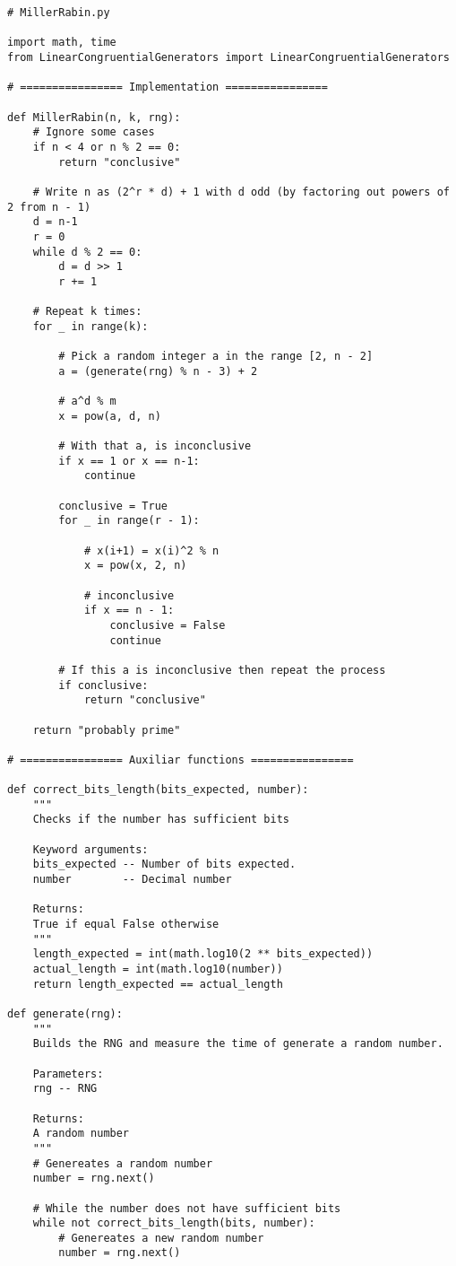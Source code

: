 \documentclass{article}
\begin{document}
\begin{lstlisting}
# MillerRabin.py

import math, time
from LinearCongruentialGenerators import LinearCongruentialGenerators

# ================ Implementation ================

def MillerRabin(n, k, rng):
	# Ignore some cases
	if n < 4 or n % 2 == 0:
		return "conclusive"

	# Write n as (2^r * d) + 1 with d odd (by factoring out powers of 2 from n - 1)
	d = n-1
	r = 0
	while d % 2 == 0:
		d = d >> 1
		r += 1

	# Repeat k times:
	for _ in range(k):
		
		# Pick a random integer a in the range [2, n - 2]
		a = (generate(rng) % n - 3) + 2

		# a^d % m
		x = pow(a, d, n)

		# With that a, is inconclusive
		if x == 1 or x == n-1:
			continue

		conclusive = True
		for _ in range(r - 1):

			# x(i+1) = x(i)^2 % n
			x = pow(x, 2, n)

			# inconclusive
			if x == n - 1:
				conclusive = False
				continue
		
		# If this a is inconclusive then repeat the process
		if conclusive:
			return "conclusive"
	
	return "probably prime"

# ================ Auxiliar functions ================

def correct_bits_length(bits_expected, number):
	"""
	Checks if the number has sufficient bits

	Keyword arguments:
	bits_expected -- Number of bits expected. 
	number        -- Decimal number

	Returns:
	True if equal False otherwise
	"""
	length_expected = int(math.log10(2 ** bits_expected))
	actual_length = int(math.log10(number))
	return length_expected == actual_length

def generate(rng):
	"""
	Builds the RNG and measure the time of generate a random number.

	Parameters:
	rng -- RNG

    Returns:
    A random number
	"""
	# Genereates a random number
	number = rng.next()

	# While the number does not have sufficient bits
	while not correct_bits_length(bits, number):
		# Genereates a new random number
		number = rng.next()
	

\end{lstlisting}
\end{document}
